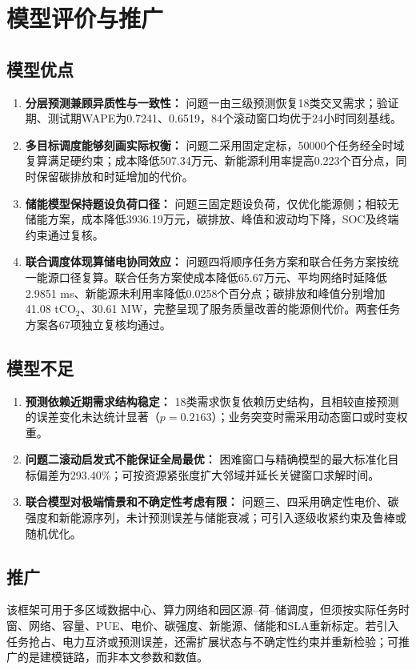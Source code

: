 \section{模型评价与推广}

\subsection{模型优点}

\begin{enumerate}
	\item \textbf{分层预测兼顾异质性与一致性：}
	问题一由三级预测恢复18类交叉需求；验证期、测试期WAPE为0.7241、0.6519，84个滚动窗口均优于24小时同刻基线。
	
	\item \textbf{多目标调度能够刻画实际权衡：}
	问题二采用固定定标，50000个任务经全时域复算满足硬约束；成本降低507.34万元、新能源利用率提高0.223个百分点，同时保留碳排放和时延增加的代价。
	
	\item \textbf{储能模型保持题设负荷口径：}
	问题三固定题设负荷，仅优化能源侧；相较无储能方案，成本降低3936.19万元，碳排放、峰值和波动均下降，SOC及终端约束通过复核。
	
	\item \textbf{联合调度体现算储电协同效应：}
	问题四将顺序任务方案和联合任务方案按统一能源口径复算。联合任务方案使成本降低65.67万元、平均网络时延降低2.9851 ms、新能源未利用率降低0.0258个百分点；碳排放和峰值分别增加41.08 tCO$_2$、30.61 MW，完整呈现了服务质量改善的能源侧代价。两套任务方案各67项独立复核均通过。
\end{enumerate}


\subsection{模型不足}

\begin{enumerate}
	\item \textbf{预测依赖近期需求结构稳定：}
	18类需求恢复依赖历史结构，且相较直接预测的误差变化未达统计显著（$p=0.2163$）；业务突变时需采用动态窗口或时变权重。
	
	\item \textbf{问题二滚动启发式不能保证全局最优：}
	困难窗口与精确模型的最大标准化目标偏差为293.40\%；可按资源紧张度扩大邻域并延长关键窗口求解时间。
	
	\item \textbf{联合模型对极端情景和不确定性考虑有限：}
	问题三、四采用确定性电价、碳强度和新能源序列，未计预测误差与储能衰减；可引入逐级收紧约束及鲁棒或随机优化。
\end{enumerate}


\subsection{推广}

该框架可用于多区域数据中心、算力网络和园区源--荷--储调度，但须按实际任务时窗、网络、容量、PUE、电价、碳强度、新能源、储能和SLA重新标定。若引入任务抢占、电力互济或预测误差，还需扩展状态与不确定性约束并重新检验；可推广的是建模链路，而非本文参数和数值。
